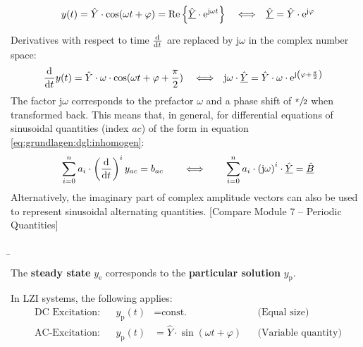 \begin{frame}
{    \begin{align*}
        y(t) &= \hat{Y} \cdot \cos(\omega t + \varphi) = \Re\left\{ \underline{\hat{Y}} \cdot \mathrm{e}^{\mathrm{j} \omega t} \right\} &
            &\Longleftrightarrow& 
            \underline{\hat{Y}} &= \hat{Y} \cdot \mathrm{e}^{\mathrm{j} \varphi} 
            \vphantom{\bigg|}\\
    \end{align*}
    Derivatives with respect to time $\dt$ are replaced by $\mathrm{j} \omega$ in the complex number space:
    \begin{align*}
        \dt y(t) &= \hat{Y} \cdot \omega \cdot \cos(\omega t + \varphi + \frac{\pi}{2}) &
            &\Longleftrightarrow& 
            \mathrm{j} \omega \cdot  \underline{\hat{Y}} &= \hat{Y} \cdot \omega \cdot \mathrm{e}^{\mathrm{j} \left(\varphi + \frac{\pi}{2}\right)}
    \end{align*}
    The factor $\mathrm{j}\omega$ corresponds to the prefactor $\omega$ and a phase shift of $\sfrac{\pi}{2}$ when transformed back.
    This means that, in general, for differential equations of sinusoidal quantities (index $ac$) of the form in equation \ref{eq:grundlagen:dgl:inhomogen}:
    \begin{equation}
        \sum_{i=0}^n a_i \cdot \left(\dt\right)^i y_{ac} = b_{ac}
        \qquad \Longleftrightarrow \qquad 
        \sum_{i=0}^n a_i \cdot \left(\mathrm{j}\omega\right)^i \cdot \underline{\hat{Y}} = \underline{\hat{B}}
        \label{eq:grundlagen:dgl:komplex}
    \end{equation}
    Alternatively, the imaginary part of complex amplitude vectors can also be used to represent sinusoidal alternating quantities.
    [Compare Module 7 – Periodic Quantities]

}%
\b{%
    The \textbf{steady state} $y_{\mathrm{e}}$ corresponds to the \textbf{particular solution} $y_{\mathrm{p}}$.
    \vspace{2mm}

    In LZI systems, the following applies:
    \begin{align*}
        \text{DC Excitation:} && y_{\mathrm{p}}(t) &= \text{const.} &&\text{(Equal size)}\\
        \text{AC-Excitation:} && y_{\mathrm{p}}(t) &= \hat{Y} \cdot \sin(\omega t + \varphi) &&\text{(Variable quantity)}
    \end{align*}

}
\end{frame}
